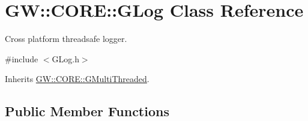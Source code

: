 \hypertarget{class_g_w_1_1_c_o_r_e_1_1_g_log}{}\section{GW\+:\+:C\+O\+RE\+:\+:G\+Log Class Reference}
\label{class_g_w_1_1_c_o_r_e_1_1_g_log}


Cross platform threadsafe logger.  




{\ttfamily \#include $<$G\+Log.\+h$>$}



Inherits \hyperlink{class_g_w_1_1_c_o_r_e_1_1_g_multi_threaded}{G\+W\+::\+C\+O\+R\+E\+::\+G\+Multi\+Threaded}.

\subsection*{Public Member Functions}
